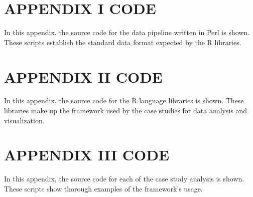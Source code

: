 

\appendixtitle
\appendix
\lstset{
  frame=bt,
  breakatwhitespace=false,
  captionpos=b
}

\chapter{APPENDIX I CODE}

In this appendix, the source code for the data pipeline written in Perl is shown. These scripts establish the standard data format expected by the R libraries.



\newpage
\chapter{APPENDIX II CODE}

In this appendix, the source code for the R language libraries is shown. These libraries make up the framework used by the case studies for data analysis and visualization.



\newpage
\chapter{APPENDIX III CODE}

In this appendix, the source code for each of the case study analysis is shown. These scripts show thorough examples of the framework's usage.


